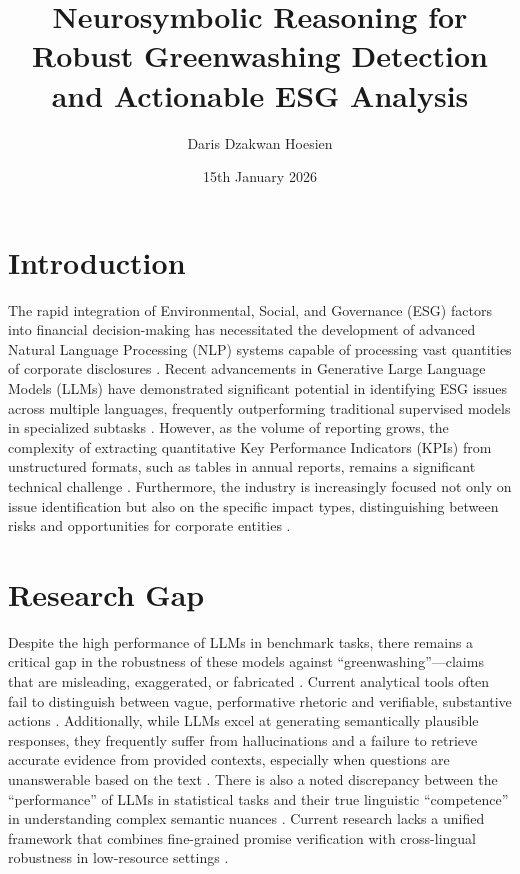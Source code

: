 \documentclass{article}
\title{Neurosymbolic Reasoning for Robust Greenwashing Detection and Actionable ESG Analysis}
\author{Daris Dzakwan Hoesien}
\date{15th January 2026}
\begin{document}
\maketitle

\section{Introduction}
The rapid integration of Environmental, Social, and Governance (ESG) factors into financial decision-making has necessitated the development of advanced Natural Language Processing (NLP) systems capable of processing vast quantities of corporate disclosures \citep{cite_001}. Recent advancements in Generative Large Language Models (LLMs) have demonstrated significant potential in identifying ESG issues across multiple languages, frequently outperforming traditional supervised models in specialized subtasks \citep{cite_007, cite_012}. However, as the volume of reporting grows, the complexity of extracting quantitative Key Performance Indicators (KPIs) from unstructured formats, such as tables in annual reports, remains a significant technical challenge \citep{cite_010}. Furthermore, the industry is increasingly focused not only on issue identification but also on the specific impact types, distinguishing between risks and opportunities for corporate entities \citep{cite_002, cite_009}.

\section{Research Gap}
Despite the high performance of LLMs in benchmark tasks, there remains a critical gap in the robustness of these models against ``greenwashing''—claims that are misleading, exaggerated, or fabricated \citep{cite_011}. Current analytical tools often fail to distinguish between vague, performative rhetoric and verifiable, substantive actions \citep{cite_011}. Additionally, while LLMs excel at generating semantically plausible responses, they frequently suffer from hallucinations and a failure to retrieve accurate evidence from provided contexts, especially when questions are unanswerable based on the text \citep{cite_004}. There is also a noted discrepancy between the ``performance'' of LLMs in statistical tasks and their true linguistic ``competence'' in understanding complex semantic nuances \citep{cite_003}. Current research lacks a unified framework that combines fine-grained promise verification with cross-lingual robustness in low-resource settings \citep{cite_005, cite_013}.
\end{document}

